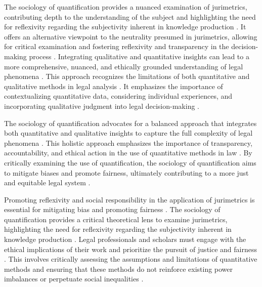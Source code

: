 The sociology of quantification provides a nuanced examination of jurimetrics, contributing depth to the understanding of the subject and highlighting the need for reflexivity regarding the subjectivity inherent in knowledge production \cite{10.1590/dados.2022.65.3.267,10.32586/rcda.v18i1.585}. It offers an alternative viewpoint to the neutrality presumed in jurimetrics, allowing for critical examination and fostering reflexivity and transparency in the decision-making process \cite{10.1590/dados.2022.65.3.267,10.32586/rcda.v18i1.585}. Integrating qualitative and quantitative insights can lead to a more comprehensive, nuanced, and ethically grounded understanding of legal phenomena \cite{10.1590/dados.2022.65.3.267,10.32586/rcda.v18i1.585}. This approach recognizes the limitations of both quantitative and qualitative methods in legal analysis \cite{10.1590/dados.2022.65.3.267,10.32586/rcda.v18i1.585}. It emphasizes the importance of contextualizing quantitative data, considering individual experiences, and incorporating qualitative judgment into legal decision-making \cite{10.1590/dados.2022.65.3.267,10.32586/rcda.v18i1.585}.

The sociology of quantification advocates for a balanced approach that integrates both quantitative and qualitative insights to capture the full complexity of legal phenomena \cite{10.1007/s11186-021-09453-1, demortain2019politics}. This holistic approach emphasizes the importance of transparency, accountability, and ethical action in the use of quantitative methods in law \cite{10.1007/s11186-021-09453-1, demortain2019politics}. By critically examining the use of quantification, the sociology of quantification aims to mitigate biases and promote fairness, ultimately contributing to a more just and equitable legal system \cite{10.1007/s11186-021-09453-1, demortain2019politics}.

Promoting reflexivity and social responsibility in the application of jurimetrics is essential for mitigating bias and promoting fairness \cite{10.1007/s11186-021-09453-1,10.5040/9781350220645}. The sociology of quantification provides a critical theoretical lens to examine jurimetrics, highlighting the need for reflexivity regarding the subjectivity inherent in knowledge production \cite{10.1007/s11186-021-09453-1,10.5040/9781350220645}. Legal professionals and scholars must engage with the ethical implications of their work and prioritize the pursuit of justice and fairness \cite{10.1007/s11186-021-09453-1,10.5040/9781350220645}. This involves critically assessing the assumptions and limitations of quantitative methods and ensuring that these methods do not reinforce existing power imbalances or perpetuate social inequalities \cite{10.1007/s11186-021-09453-1,10.5040/9781350220645}.

